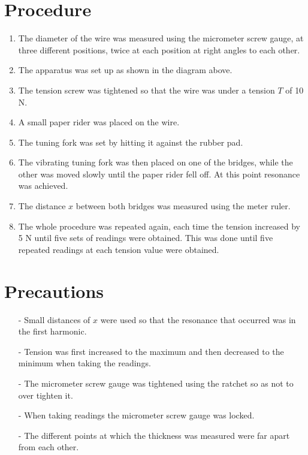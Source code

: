 \documentclass[12pt, a4paper]{article}
\begin{document}
\section*{Procedure}
\begin{enumerate}
    \item The diameter of the wire was measured using the micrometer screw gauge, at three different positions, twice at each position at right angles to each other.
    \item The apparatus was set up as shown in the diagram above.
    \item The tension screw was tightened so that the wire was under a tension $T$ of 10 N.
    \item A small paper rider was placed on the wire.
    \item The tuning fork was set by hitting it against the rubber pad.
    \item The vibrating tuning fork was then placed on one of the bridges, while the other was moved slowly until the paper rider fell off. At this point resonance was achieved.
    \item The distance $x$ between both bridges was measured using the meter ruler.
    \item The whole procedure was repeated again, each time the tension increased by 5 N until five sets of readings were obtained. This was done until five repeated readings at each tension value were obtained.
\end{enumerate}

\section*{Precautions}
\begin{itemize}
    \item[-] Small distances of $x$ were used so that the resonance that occurred was in the first harmonic.
    \item[-] Tension was first increased to the maximum and then decreased to the minimum when taking the readings.
    \item[-] The micrometer screw gauge was tightened using the ratchet so as not to over tighten it.
    \item[-] When taking readings the micrometer screw gauge was locked. 
    \item[-] The different points at which the thickness was measured were far apart from each other.
\end{itemize}
\end{document}
